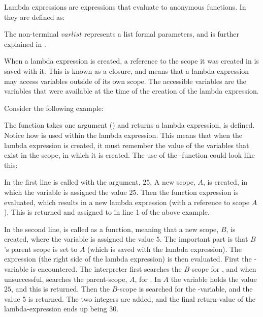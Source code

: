 Lambda expressions are expressions that evaluate to anonymous functions. In
\productname{} they are defined as:

\begin{ebnf}
\end{ebnf}

The non-terminal $varlist$ represents a list formal parameters, and is further
explained in .

When a lambda expression is created, a reference to the scope it was created in
is saved with it. This is known as a closure, and means that a lambda
expression may access variables outside of its own scope. The accessible
variables are the variables that were available at the time of the creation of
the lambda expression.

Consider the following example:


The function  takes one argument () and
returns a lambda expression, is defined. Notice how  is used within
the lambda expression. This means that when the lambda expression is created, it
must remember the value of the variables that exist in the scope, in which it is
created. The use of the -function could look like this:


In the first line  is called with the argument, $25$. A new
scope, $A$, is created, in which the variable  is assigned the value
$25$. Then the function expression is evaluated, which results in a new lambda
expression (with a reference to scope $A$).  This is returned and assigned to
 in line 1 of the above example.

In the second line,  is called as a function, meaning
that a new scope, $B$, is created, where the variable  is
assigned the value $5$. The important part is that $B$'s parent scope is set to
$A$ (which is saved with the lambda expression). The expression (the right side
of the lambda expression) is then evaluated. First the -variable is
encountered. The interpreter first searches the $B$-scope for , and
when unsuccessful, searches the parent-scope, $A$, for . In $A$ the
variable  holds the value $25$, and this is returned. Then the
$B$-scope is searched for the -variable, and the value $5$ is
returned. The two integers are added, and the final return-value of the
lambda-expression ends up being $30$.

